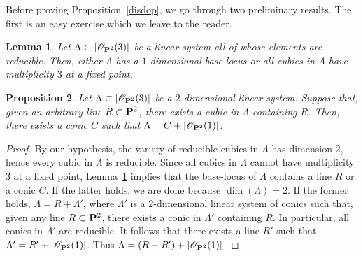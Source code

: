 \documentclass[11pt]{article}
\let\mathcal\mathscr
\newtheorem{lemm}{Lemma}[section]
\newtheorem{prop}[lemm]{Proposition}
\theoremstyle{definition}
\newcommand\cO{\mathcal{O}}\let\OO\cO
\begin{document}
Before proving Proposition~\ref{disdop}, we go through two preliminary results. The first is an easy exercise which we leave to the reader.

\begin{lemm}\label{tuttired}
Let $\Lambda\subset|\cO_{\PP^2}(3)|$ be a linear system all of whose elements are reducible. Then, either $\Lambda$ has a $1$-dimensional base-locus or all cubics in $\Lambda$ have multiplicity $3$ at a fixed point.
\end{lemm}

\begin{prop}\label{quadsig}
Let $\Lambda\subset|\cO_{\PP^2}(3)|$ be a $2$-dimensional linear system.
Suppose that, given an arbitrary line $R\subset\PP^2$, there exists a cubic in $\Lambda$ containing $R$. Then, there exists a conic $C$ such that $\Lambda=C+|\cO_{\PP^2}(1)|$.
\end{prop}

\begin{proof}
By our hypothesis, the variety of reducible cubics in $\Lambda$ has dimension $2$, hence every cubic in $\Lambda$ is reducible. Since all cubics in $\Lambda$ cannot have multiplicity $3$ at a fixed point,
Lemma~\ref{tuttired} implies that the base-locus of $\Lambda$ contains a line $R$ or a conic $C$. If the latter holds, we are done because $\dim(\Lambda)=2$. If the former holds,
$\Lambda=R+\Lambda'$, where $\Lambda'$ is a $2$-dimensional linear system of conics such that, given any line $R\subset\PP^2$, there exists a conic in $\Lambda'$ containing $R$. In particular, all conics in $\Lambda'$ are reducible. It follows that there exists a line $R'$ such that $\Lambda'=R'+|\cO_{\PP^2}(1)|$. Thus $\Lambda=(R+R')+|\cO_{\PP^2}(1)|$.
\end{proof}
\end{document}
